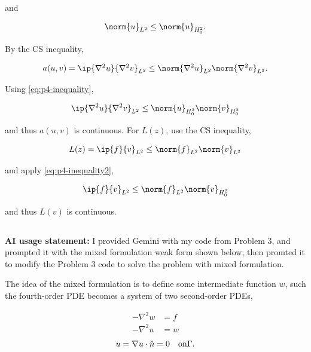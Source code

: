 \documentclass{hw-template}
\newcommand{\ltwo}{{L^2}}
\newcommand{\hz}{{H^2_0}}
\begin{document}
and 

\begin{equation}
    \norm{ u}_\ltwo \leq \norm{u}_\hz.\label{eq:p4-inequality2}
\end{equation}

By the CS inequality,

\begin{equation}
    a(u, v) = \ip{\nabla^2 u}{\nabla^2 v}_\ltwo \leq \norm{\nabla^2 u}_\ltwo \norm{\nabla^2 v}_\ltwo.
\end{equation}

Using \autoref{eq:p4-inequality}, 

\begin{equation}
    \ip{\nabla^2 u}{\nabla^2 v}_\ltwo \leq \norm{u}_\hz \norm{v}_\hz
\end{equation}

and thus $a(u,v)$ is continuous. For $L(z)$, use the CS inequality,

\begin{equation}
    L(z) = \ip{f}{v}_\ltwo \leq \norm{f}_\ltwo \norm{v}_\ltwo
\end{equation}

and apply \autoref{eq:p4-inequality2},

\begin{equation}
    \ip{f}{v}_\ltwo \leq \norm{f}_\ltwo \norm{v}_\hz
\end{equation}

and thus $L(v)$ is continuous.

\subsection{}

\textbf{AI usage statement:} I provided Gemini with my code from Problem 3, and prompted it with the mixed formulation weak form shown below, then promted it to modify the Problem 3 code to solve the problem with mixed formulation.

The idea of the mixed formulation is to define some intermediate function $w$, such the fourth-order PDE becomes a system of two second-order PDEs,

\begin{align}
    -\nabla^2 w &= f\\
    -\nabla^2 u &= w
\end{align}
\begin{equation}
    u = \nabla u \cdot \hat{n} = 0\quad {\rm on} \Gamma.
\end{equation}
\end{document}
